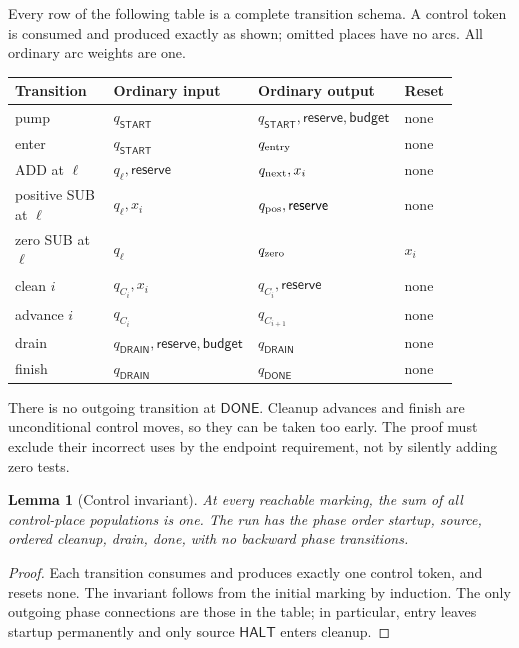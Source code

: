 \documentclass[11pt,letterpaper]{article}
\newtheorem{lemma}[theorem]{Lemma}
\theoremstyle{definition}
\theoremstyle{remark}
\newcommand{\HALT}{\mathsf{HALT}}
\newcommand{\DONE}{\mathsf{DONE}}
\newcommand{\START}{\mathsf{START}}
\newcommand{\res}{\mathsf{reserve}}
\newcommand{\bud}{\mathsf{budget}}
\begin{document}
Every row of the following table is a complete transition schema. A control token is consumed and produced exactly as shown; omitted places have no arcs. All ordinary arc weights are one.
\begin{center}\small
\begin{tabular}{p{0.22\linewidth}p{0.28\linewidth}p{0.28\linewidth}p{0.10\linewidth}}
\toprule
Transition & Ordinary input & Ordinary output & Reset\\
\midrule
pump & $q_{\START}$ & $q_{\START},\res,\bud$ & none\\
enter & $q_{\START}$ & $q_{\rm entry}$ & none\\
ADD at $\ell$ & $q_\ell,\res$ & $q_{\rm next},x_i$ & none\\
positive SUB at $\ell$ & $q_\ell,x_i$ & $q_{\rm pos},\res$ & none\\
zero SUB at $\ell$ & $q_\ell$ & $q_{\rm zero}$ & $x_i$\\
clean $i$ & $q_{C_i},x_i$ & $q_{C_i},\res$ & none\\
advance $i$ & $q_{C_i}$ & $q_{C_{i+1}}$ & none\\
drain & $q_{\mathsf{DRAIN}},\res,\bud$ & $q_{\mathsf{DRAIN}}$ & none\\
finish & $q_{\mathsf{DRAIN}}$ & $q_{\DONE}$ & none\\
\bottomrule
\end{tabular}\end{center}
There is no outgoing transition at $\DONE$. Cleanup advances and finish are unconditional control moves, so they can be taken too early. The proof must exclude their incorrect uses by the endpoint requirement, not by silently adding zero tests.

\begin{lemma}[Control invariant]
At every reachable marking, the sum of all control-place populations is one. The run has the phase order startup, source, ordered cleanup, drain, done, with no backward phase transitions.
\end{lemma}
\begin{proof}
Each transition consumes and produces exactly one control token, and resets none. The invariant follows from the initial marking by induction. The only outgoing phase connections are those in the table; in particular, entry leaves startup permanently and only source $\HALT$ enters cleanup.
\end{proof}
\end{document}
